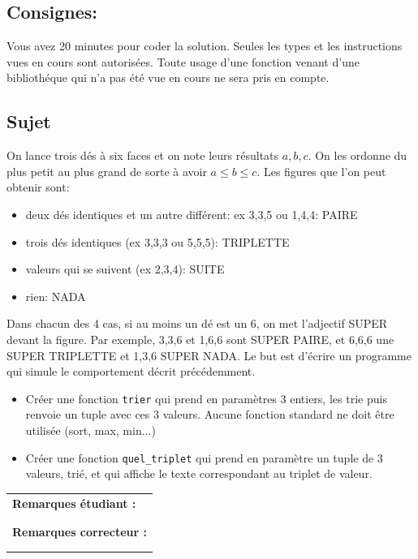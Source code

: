 \documentclass[a4paper,11pt]{article}
\begin{document}
\subsection*{Consignes:} Vous avez 20 minutes pour coder la solution. Seules les types et les instructions vues en cours sont autorisées. Toute usage d'une fonction 
venant d'une bibliothéque qui n'a pas été vue en cours ne sera pris en compte. 


\subsection*{Sujet}

On lance trois dés à six faces et on note leurs résultats $a,b,c$. On les ordonne du plus petit au plus grand de sorte à avoir $a \leq  b \leq c$. Les figures que l'on peut obtenir sont:
\begin{itemize}
\item deux dés identiques et un autre différent: ex 3,3,5 ou 1,4,4: PAIRE
\item trois dés identiques (ex 3,3,3 ou 5,5,5): TRIPLETTE
\item valeurs qui se suivent (ex 2,3,4): SUITE
\item rien: NADA
\end{itemize}

Dans chacun des 4 cas, si au moins un dé est un 6, on met l'adjectif SUPER devant la figure. Par exemple, 3,3,6 et 1,6,6 sont SUPER PAIRE, et 6,6,6 une SUPER TRIPLETTE et 1,3,6 SUPER NADA.
Le but est d'écrire un programme qui simule le comportement décrit précédemment.
\begin{itemize}
\item[1.] Créer une fonction \texttt{trier} qui prend en paramètres 3 entiers, les trie puis renvoie un tuple avec ces 3 valeurs. Aucune fonction standard ne doit être utilisée (sort, max, min...)
\item[2.] Créer une fonction \texttt{quel\_triplet} qui prend en paramètre un tuple de 3 valeurs, trié, et qui affiche le texte correspondant au triplet de valeur.
\end{itemize}


\begin{table}[h!]
\centering
\renewcommand{\arraystretch}{1.4} %
\begin{tabular}{|p{15cm}|}
\hline
\textbf{Remarques étudiant :}    \\
 \\
 \\
\hline
\textbf{Remarques correcteur :}  \\
 \\
 \\
\hline
\end{tabular}
\end{table}
\end{document}
